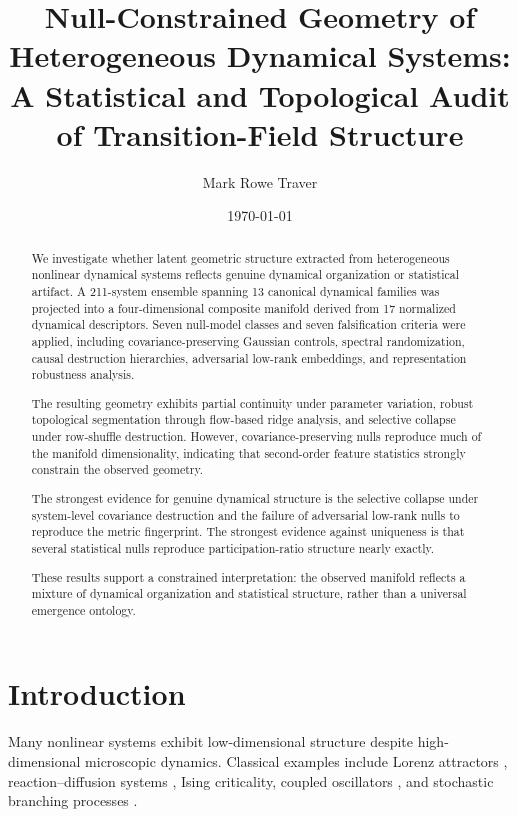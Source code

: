 \documentclass[
reprint,
superscriptaddress,
amsmath,
amssymb,
aps,
chaos
]{revtex4-2}
\begin{document}
\title{
Null-Constrained Geometry of Heterogeneous Dynamical Systems:
A Statistical and Topological Audit of Transition-Field Structure
}

\author{Mark Rowe Traver}

\date{\today}

\begin{abstract}
We investigate whether latent geometric structure extracted from heterogeneous nonlinear dynamical systems reflects genuine dynamical organization or statistical artifact. A 211-system ensemble spanning 13 canonical dynamical families was projected into a four-dimensional composite manifold derived from 17 normalized dynamical descriptors. Seven null-model classes and seven falsification criteria were applied, including covariance-preserving Gaussian controls, spectral randomization, causal destruction hierarchies, adversarial low-rank embeddings, and representation robustness analysis.

The resulting geometry exhibits partial continuity under parameter variation, robust topological segmentation through flow-based ridge analysis, and selective collapse under row-shuffle destruction. However, covariance-preserving nulls reproduce much of the manifold dimensionality, indicating that second-order feature statistics strongly constrain the observed geometry.

The strongest evidence for genuine dynamical structure is the selective collapse under system-level covariance destruction and the failure of adversarial low-rank nulls to reproduce the metric fingerprint. The strongest evidence against uniqueness is that several statistical nulls reproduce participation-ratio structure nearly exactly.

These results support a constrained interpretation: the observed manifold reflects a mixture of dynamical organization and statistical structure, rather than a universal emergence ontology.
\end{abstract}

\maketitle

\section{Introduction}

Many nonlinear systems exhibit low-dimensional structure despite high-dimensional microscopic dynamics. Classical examples include Lorenz attractors \cite{lorenz1963deterministic}, reaction--diffusion systems \cite{prigogine1968dissipative}, Ising criticality, coupled oscillators \cite{vanderpol1927forced}, and stochastic branching processes \cite{feigenbaum1978quantitative}.
\end{document}
